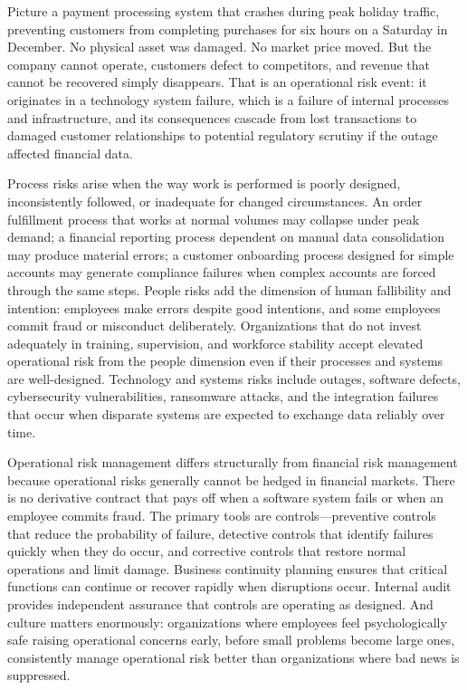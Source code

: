 \documentclass[11pt,openany]{book}
\begin{document}
Picture a payment processing system that crashes during peak holiday traffic, preventing customers from completing purchases for six hours on a Saturday in December. No physical asset was damaged. No market price moved. But the company cannot operate, customers defect to competitors, and revenue that cannot be recovered simply disappears. That is an operational risk event: it originates in a technology system failure, which is a failure of internal processes and infrastructure, and its consequences cascade from lost transactions to damaged customer relationships to potential regulatory scrutiny if the outage affected financial data.

Process risks arise when the way work is performed is poorly designed, inconsistently followed, or inadequate for changed circumstances. An order fulfillment process that works at normal volumes may collapse under peak demand; a financial reporting process dependent on manual data consolidation may produce material errors; a customer onboarding process designed for simple accounts may generate compliance failures when complex accounts are forced through the same steps. People risks add the dimension of human fallibility and intention: employees make errors despite good intentions, and some employees commit fraud or misconduct deliberately. Organizations that do not invest adequately in training, supervision, and workforce stability accept elevated operational risk from the people dimension even if their processes and systems are well-designed. Technology and systems risks include outages, software defects, cybersecurity vulnerabilities, ransomware attacks, and the integration failures that occur when disparate systems are expected to exchange data reliably over time.

Operational risk management differs structurally from financial risk management because operational risks generally cannot be hedged in financial markets. There is no derivative contract that pays off when a software system fails or when an employee commits fraud. The primary tools are controls---preventive controls that reduce the probability of failure, detective controls that identify failures quickly when they do occur, and corrective controls that restore normal operations and limit damage. Business continuity planning ensures that critical functions can continue or recover rapidly when disruptions occur. Internal audit provides independent assurance that controls are operating as designed. And culture matters enormously: organizations where employees feel psychologically safe raising operational concerns early, before small problems become large ones, consistently manage operational risk better than organizations where bad news is suppressed.
\end{document}
